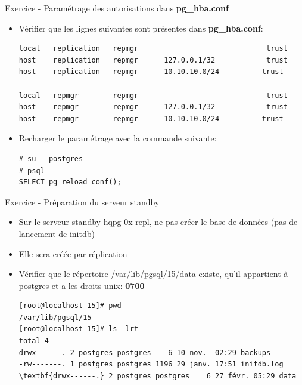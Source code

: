 
\begin{frame}[fragile]{Exercice - Paramétrage des autorisations dans \textbf{pg\_hba.conf}}

   \begin{itemize}
      \item Vérifier que les lignes suivantes sont présentes dans \textbf{pg\_hba.conf}:
\begin{tiny}
\begin{Verbatim}[commandchars=\\\{\}]
local   replication   repmgr                              trust
host    replication   repmgr      127.0.0.1/32            trust
host    replication   repmgr      10.10.10.0/24          trust

local   repmgr        repmgr                              trust
host    repmgr        repmgr      127.0.0.1/32            trust
host    repmgr        repmgr      10.10.10.0/24          trust
\end{Verbatim}
\end{tiny}
      \item Recharger le paramétrage avec la commande suivante:
\begin{tiny}
\begin{Verbatim}[commandchars=\\\{\}]
# su - postgres
# psql
SELECT pg_reload_conf();
\end{Verbatim}
\end{tiny}
   \end{itemize}

\end{frame}


\begin{frame}[fragile]{Exercice - Préparation du serveur standby}

   \begin{itemize}
      \item Sur le serveur standby hqpg-0x-repl, ne pas créer le base de données (pas de lancement de initdb)
      \item Elle sera créée par réplication
      \item Vérifier que le répertoire /var/lib/pgsql/15/data existe, qu'il appartient à postgres et a les droits unix: \textbf{0700}
\begin{tiny}
\begin{Verbatim}[commandchars=\\\{\}]
[root@localhost 15]# pwd
/var/lib/pgsql/15
[root@localhost 15]# ls -lrt
total 4
drwx------. 2 postgres postgres    6 10 nov.  02:29 backups
-rw-------. 1 postgres postgres 1196 29 janv. 17:51 initdb.log
\textbf{drwx------.} 2 postgres postgres    6 27 févr. 05:29 data
\end{Verbatim}
\end{tiny}
   \end{itemize}

\end{frame}


